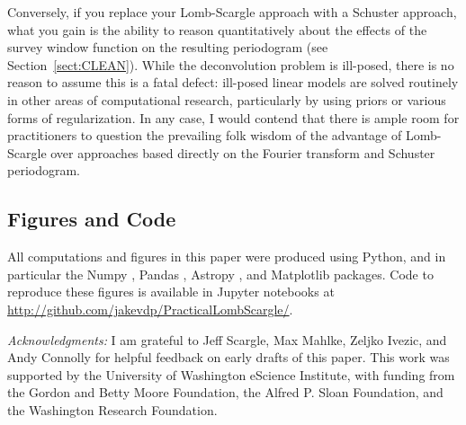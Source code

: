 \documentclass[preprint]{aastex}
\newcommand{\Sect}[1]{Section~\ref{sect:#1}}
\newcommand{\sect}[1]{\Sect{#1}}
\begin{document}
Conversely, if you replace your Lomb-Scargle approach with a Schuster approach,
what you gain is the ability to reason quantitatively about the effects of the
survey window function on the resulting periodogram (see \sect{CLEAN}).
While the deconvolution problem is ill-posed, there is no reason to assume
this is a fatal defect: ill-posed linear models are solved routinely in
other areas of computational research, particularly by using priors or
various forms of regularization.
In any case, I would contend that there is ample room for practitioners to
question the prevailing folk wisdom of the advantage of Lomb-Scargle
over approaches based directly on the Fourier transform and Schuster
periodogram.

\subsection{Figures and Code}

All computations and figures in this paper were produced using Python,
and in particular the
Numpy \citep{numpy, numpybook},
Pandas \citep{pandas},
Astropy \citep{Astropy2013},
and Matplotlib \citep{matplotlib} packages.
Code to reproduce these figures is available in Jupyter notebooks at
\url{http://github.com/jakevdp/PracticalLombScargle/}.

\acknowledgments
{\it Acknowledgments:} I am grateful to Jeff Scargle, Max Mahlke,
Zeljko Ivezic, and Andy Connolly for helpful feedback on early drafts
of this paper.
This work was supported by the University of Washington eScience Institute,
with funding from the Gordon and Betty Moore Foundation, the Alfred P. Sloan
Foundation, and the Washington Research Foundation.



\end{document}
